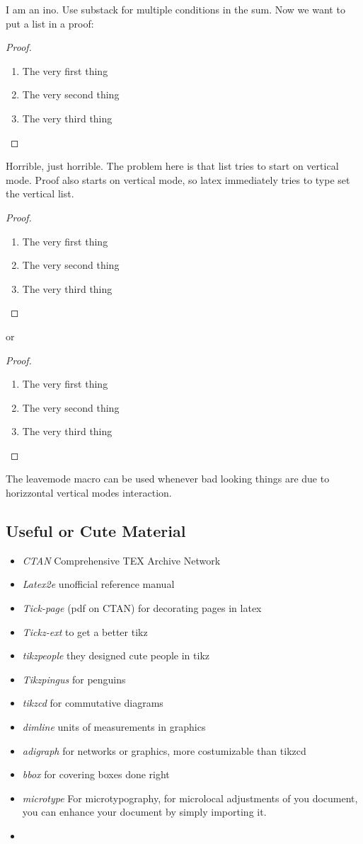 \documentclass[11pt,a4paper,oneside,openany]{book}
\begin{document}
I am an ino. Use substack for multiple conditions in the sum.
Now we want to put a list in a proof:
\begin{proof}
    \begin{enumerate}
        \item The very first thing
        \item The very second thing
        \item The very third thing
    \end{enumerate}
\end{proof}
Horrible, just horrible. The problem here is that list tries to start on vertical mode. Proof also starts on vertical mode, so latex immediately tries to type set the vertical list. 
\begin{proof}\
    \begin{enumerate}
        \item The very first thing
        \item The very second thing
        \item The very third thing
    \end{enumerate}
\end{proof}
or
\begin{proof}\leavevmode
    \begin{enumerate}
        \item The very first thing
        \item The very second thing
        \item The very third thing
    \end{enumerate}
\end{proof}
The leavemode macro can be used whenever bad looking things are due to horizzontal vertical modes interaction.

\subsection{Useful or Cute Material}
\begin{itemize}
    \item \emph{CTAN} Comprehensive TEX Archive Network
    \item \emph{Latex2e} unofficial reference manual
    \item \emph{Tick-page} (pdf on CTAN) for decorating pages in latex
    \item \emph{Tickz-ext} to get a better tikz
    \item \emph{tikzpeople} they designed cute people in tikz
    \item \emph{Tikzpingus} for penguins
    \item \emph{tikzcd} for commutative diagrams
    \item \emph{dimline} units of measurements in graphics
    \item \emph{adigraph} for networks or graphics, more costumizable than tikzcd
    \item \emph{bbox} for covering boxes done right
    \item \emph{microtype} For microtypography, for microlocal adjustments of you document, you can enhance your document by simply importing it.
    \item 
\end{itemize}
\end{document}

